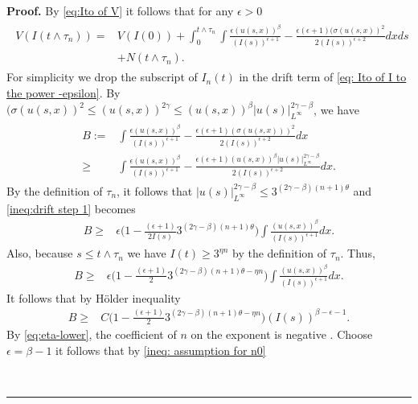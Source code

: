\documentclass[12pt]{article}
\newenvironment{proof}[1][Proof]{\noindent\textbf{#1.} }{\ \rule{0.5em}{0.5em}}
\numberwithin{equation}{section}
\begin{document}
\begin{proof}
    By \eqref{eq:Ito of V} it follows that for any $\epsilon>0$
\begin{align}
     \begin{split}
         V(I(t\land \tau_n))=&V(I(0))+\int_0^{t\land \tau_n}\int \frac{\epsilon (u(s,x))^{\beta}}{(I(s))^{\epsilon+1}}-\frac{\epsilon(\epsilon+1)(\sigma(u(s,x))^2}{2(I(s))^{\epsilon+2}}dxds\\
         &+N(t\land \tau_n).
     \end{split}\label{eq: Ito of I to the power -epsilon}
\end{align}
For simplicity we drop the subscript of $I_n(t)$ in the drift term of \eqref{eq: Ito of I to the power -epsilon}. By $(\sigma(u(s,x))^2\leq (u(s,x))^{2\gamma}\leq (u(s,x))^{\beta}|u(s)|_{L^\infty}^{2\gamma-\beta}$, we have 
\begin{align}
   \begin{split}
        B:=&\int \frac{\epsilon (u(s,x))^{\beta}}{(I(s))^{\epsilon+1}}-\frac{\epsilon(\epsilon+1)(\sigma(u(s,x)))^2}{2(I(s))^{\epsilon+2}}dx\\
    \geq&\int \frac{\epsilon (u(s,x))^{\beta}}{(I(s))^{\epsilon+1}}-\frac{\epsilon(\epsilon+1)(u(s,x))^{\beta}|u(s)|_{L^\infty}^{2\gamma-\beta}}{2(I(s))^{\epsilon+2}}dx.
   \end{split}\label{ineq:drift step 1}
\end{align}
By the definition of $\tau_n$, it follows that $|u(s)|_{L^\infty}^{2\gamma-\beta}\leq 3^{(2\gamma-\beta)(n+1)\theta}$ and \eqref{ineq:drift step 1} becomes
\begin{align}
    B\geq & \epsilon\Big(1-\frac{(\epsilon+1)}{2I(s)}3^{(2\gamma-\beta)(n+1)\theta}\Big)\int \frac{ (u(s,x))^{\beta}}{(I(s))^{\epsilon+1}}dx.\label{ineq:drift step 2}
\end{align}
Also, because $s\leq t\land \tau_n$ we have $I(t)\geq 3^{\eta n}$ by the definition of $\tau_n$. Thus,
\begin{align}
    B\geq &\epsilon\Big(1-\frac{(\epsilon+1)}{2}3^{(2\gamma-\beta)(n+1)\theta-\eta n}\Big)\int \frac{ (u(s,x))^{\beta}}{(I(s))^{\epsilon+1}}dx.\label{ineq: drift step 3}
\end{align}
It follows that by H\"older inequality
\begin{align}
     B\geq & C\Big(1-\frac{(\epsilon+1)}{2}3^{(2\gamma-\beta)(n+1)\theta-\eta n}\Big)(I(s))^{\beta-\epsilon-1}.\label{ineq: drift}
\end{align}
By \eqref{eq:eta-lower}, the coefficient of $n$ on the exponent is negative . Choose $\epsilon=\beta-1$ it follows that by \eqref{ineq: assumption for n0}

\end{proof}
\end{document}
